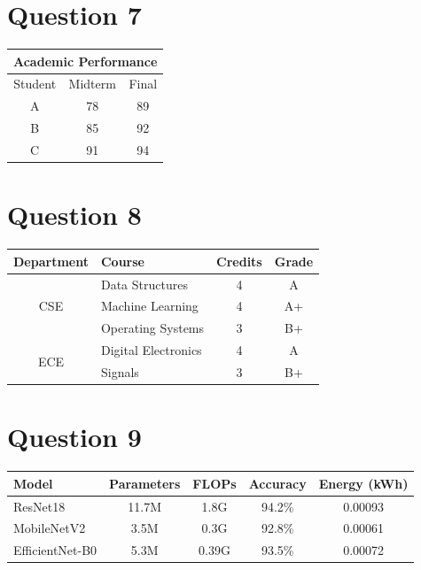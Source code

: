 \documentclass[12pt,a4paper]{article}
\begin{document}
\section*{Question 7}
\begin{center}
\begin{tabular}{|c|c|c|}
\hline
\multicolumn{3}{|c|}{\textbf{Academic Performance}}\\
\hline
Student & Midterm & Final\\
\hline
A & 78 & 89\\
B & 85 & 92\\
C & 91 & 94\\
\hline
\end{tabular}
\end{center}

\section*{Question 8}
\begin{center}
\begin{tabular}{|c|l|c|c|}
\hline
\textbf{Department} & \textbf{Course} & \textbf{Credits} & \textbf{Grade}\\
\hline
\multirow{3}{*}{CSE}
& Data Structures & 4 & A\\
& Machine Learning & 4 & A+\\
& Operating Systems & 3 & B+\\
\hline
\multirow{2}{*}{ECE}
& Digital Electronics & 4 & A\\
& Signals & 3 & B+\\
\hline
\end{tabular}
\end{center}

\section*{Question 9}
\begin{center}
\begin{tabular}{|l|c|c|c|c|}
\hline
\rowcolor{headerblue}
\color{white}\textbf{Model} &
\color{white}\textbf{Parameters} &
\color{white}\textbf{FLOPs} &
\color{white}\textbf{Accuracy} &
\color{white}\textbf{Energy (kWh)}\\
\hline
ResNet18 & 11.7M & 1.8G & 94.2\% & 0.00093\\
MobileNetV2 & 3.5M & 0.3G & 92.8\% & 0.00061\\
EfficientNet-B0 & 5.3M & 0.39G & 93.5\% & 0.00072\\
\hline
\end{tabular}
\end{center}
\end{document}
